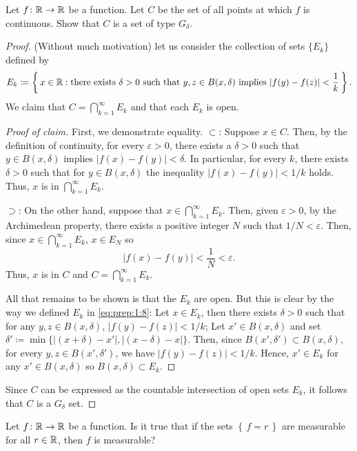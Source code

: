 \begin{problem}
Let $f\colon\mathbb{R}\to\mathbb{R}$ be a function. Let $C$ be the set of all points
at which $f$ is continuous. Show that $C$ is a set of type $G_\delta$.
\end{problem}
\begin{proof}
(Without much motivation) let us consider the collection of sets $\{E_k\}$
defined by
\begin{equation}
\label{eq:prep:1:8}
E_k\coloneqq\left\{\,x\in\mathbb{R}:
\text{there exists $\delta>0$ such that $y,z\in B(x,\delta)$ implies $\left|f(y)-f(z)\right|<\frac{1}{k}$}\,\right\}.
\end{equation}
We claim that $C=\bigcap_{k=1}^\infty E_k$ and that each $E_k$ is open.
\begin{proof}[Proof of claim]
\renewcommand{\qedsymbol}{$\clubsuit$}
First, we demonstrate equality. $\subset$: Suppose $x\in C$. Then, by the
definition of continuity, for every $\varepsilon>0$, there exists a
$\delta>0$ such that $y\in B(x,\delta)$ implies $|f(x)-f(y)|<\delta$. In
particular, for every $k$, there exists $\delta>0$ such that for $y\in
B(x,\delta)$ the inequality $|f(x)-f(y)|<1/k$ holds. Thus, $x$ is in
$\bigcap_{k=1}^\infty E_k$.

$\supset$: On the other hand, suppose that $x\in\bigcap_{k=1}^\infty
E_k$. Then, given $\varepsilon>0$, by the Archimedean property, there
exists a positive integer $N$ such that $1/N<\varepsilon$. Then, since
$x\in\bigcap_{k=1}^\infty E_k$, $x\in E_N$ so
\begin{equation}
  \label{eq:prep:1:9}
|f(x)-f(y)|<\frac{1}{N}<\varepsilon.
\end{equation}
Thus, $x$ is in $C$ and $C=\bigcap_{k=1}^\infty E_k$.

All that remains to be shown is that the $E_k$ are open. But this is clear
by the way we defined $E_k$ in \eqref{eq:prep:1:8}: Let $x\in E_k$, then
there exists $\delta>0$ such that for any $y,z\in B(x,\delta)$,
$|f(y)-f(z)|<1/k$; Let $x'\in B(x,\delta)$ and set
$\delta'\coloneqq\min\{|(x+\delta)-x'|,|(x-\delta)-x|\}$. Then, since
$B(x',\delta')\subset B(x,\delta)$, for every $y,z\in B(x',\delta')$, we
have $|f(y)-f(z)|<1/k$. Hence, $x'\in E_k$ for any $x'\in B(x,\delta)$
so $B(x,\delta)\subset E_k$.
\end{proof}
Since $C$ can be expressed as the countable intersection of open sets
$E_k$, it follows that $C$ is a $G_\delta$ set.
\end{proof}
\begin{problem}
Let $f\colon\mathbb{R}\to\mathbb{R}$ be a function. Is it true that if the sets
$\left\{\,f=r\,\right\}$ are measurable for all $r\in\mathbb{R}$, then $f$ is
measurable?
\end{problem}
